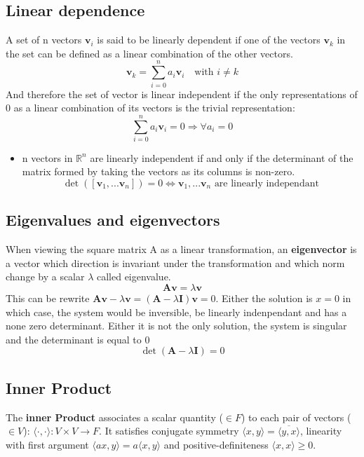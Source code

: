\documentclass[twocolumn]{article}
\numberwithin{equation}{section}
\begin{document}
	\subsection{Linear dependence}
A set of n vectors $\mathbf{v}_i$ is said to be linearly dependent if one of the vectors $\mathbf{v}_k$ in the set can be defined as a linear combination of the other vectors.
$$\mathbf{v}_k=\sum_{i=0}^{n} a_i \mathbf{v}_i \quad \mbox{with } i \neq k$$
And therefore the set of vector is linear independent if the only representations of 0 as a linear combination of its vectors is the trivial representation:
$$ \sum_{i=0}^{n} a_i \mathbf{v}_i = 0 \Rightarrow \forall a_i=0 $$
\begin{itemize}
	\item n vectors in $\mathbb{R}^n$ are linearly independent if and only if the determinant of the matrix formed by taking the vectors as its columns is non-zero.
$$\det([\mathbf{v}_1,...\mathbf{v}_n])=0 \Leftrightarrow {\mathbf{v}_1,...\mathbf{v}_n} \mbox{ are linearly independant}$$
\end{itemize}




	\subsection{Eigenvalues and eigenvectors}
When viewing the square matrix A as a linear transformation, an \textbf{eigenvector} is a vector which direction is invariant under the transformation and which norm change by a scalar $\lambda$ called eigenvalue.
$$\mathbf{Av} = \lambda \mathbf{v}$$
This can be rewrite $\mathbf{Av} -\lambda \mathbf{v} = (\mathbf{A} -\lambda\mathbf{I}) \mathbf{v}=0$. Either the solution is $x=0$ in which case, the system would be inversible, be linearly indenpendant and has a none zero determinant. Either it is not the only solution, the system is singular and the determinant is equal to 0
$$\det(\mathbf{A} -\lambda\mathbf{I})=0$$


	\subsection{Inner Product}
The \textbf{inner Product} associates a scalar quantity ($\in F$) to each pair of vectors ($\in V$): $ \langle \cdot, \cdot \rangle : V \times V \to F $. It satisfies conjugate symmetry $\langle x,y\rangle =\overline{\langle y,x\rangle}$, linearity with first argument $\langle ax,y\rangle = a \langle x,y\rangle$ and positive-definiteness $\langle x,x\rangle \geq 0$.
\end{document}
